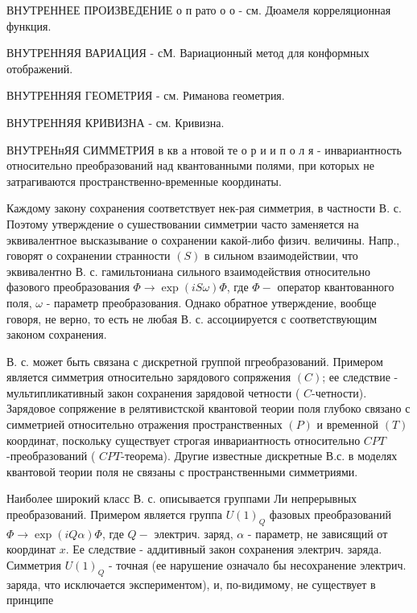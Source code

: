 \documentclass[10pt]{article}
\begin{document}
ВНУТРЕННЕЕ ПРОИЗВЕДЕНИЕ о п рато о о - см. Дюамеля корреляционная функция.



ВНУТРЕННЯЯ ВАРИАЦИЯ - сМ. Вариационный метод для конформных отображений.



ВНУТРЕННЯЯ ГЕОМЕТРИЯ - см. Риманова геометрия.



ВНУТРЕННЯЯ КРИВИЗНА - см. Кривизна.



ВНУТРЕНнЯЯ СИММЕТРИЯ в кв а нтовой те о р и и п о л я - инвариантность относительно преобразований над квантованными полями, при которых не затрагиваются пространственно-временные координаты.



Каждому закону сохранения соответствует нек-рая симметрия, в частности В. с. Поэтому утверждение о сушествовании симметрии часто заменяется на эквивалентное высказывание о сохранении какой-либо физич. величины. Напр., говорят о сохранении странности $(S)$ в сильном взаимодействии, что эквивалентно В. с. гамильтониана сильного взаимодействия относительно фазового преобразования $\Phi \rightarrow \exp (i S \omega) \Phi$, где $\Phi-$ оператор квантованного поля, $\omega$ - параметр преобразования. Однако обратное утверждение, вообще говоря, не верно, то есть не любая В. с. ассоциируется с соответствующим законом сохранения.



В. с. может быть связана с дискретной группой пгреобразований. Примером является симметрия относительно зарядового сопряжения $(C)$; ее следствие - мультипликативный закон сохранения зарядовой четности ( $C$-четности). Зарядовое сопряжение в релятивистской квантовой теории поля глубоко связано с симметрией относительно отражения пространственных $(P)$ и временной $(T)$ координат, поскольку существует строгая инвариантность относительно $C P T$-преобразований ( $C P T$-теорема). Другие известные дискретные В.с. в моделях квантовой теории поля не связаны с пространственными симметриями.



Наиболее широкий класс В. с. описывается группами Ли непрерывных преобразований. Примером является группа $U(1)_{Q}$ фазовых преобразований $\Phi \rightarrow \exp (i Q \alpha) \Phi$, где $Q-$ электрич. заряд, $\alpha$ - параметр, не зависящий от координат $x$. Ее следствие - аддитивный закон сохранения электрич. заряда. Симметрия $U(1)_{Q}$ - точная (ее нарушение означало бы несохранение электрич. заряда, что исключается экспериментом), и, по-видимому, не существует в принципе
\end{document}
